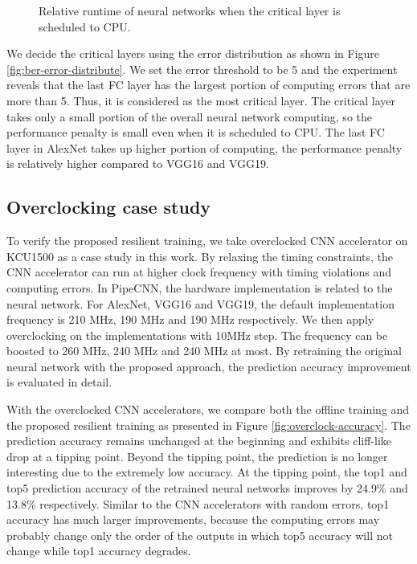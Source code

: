 \begin{figure}
        \caption{Relative runtime of neural networks when the critical layer is scheduled to CPU.}
        \label{fig:clp_perf}
\end{figure}

We decide the critical layers using the error distribution as shown in Figure \ref{fig:ber-error-distribute}.
We set the error threshold to be 5 and the experiment reveals that the last FC 
layer has the largest portion of computing errors that are more than 5. Thus, it is considered as 
the most critical layer. The critical layer takes only a small portion of the overall 
neural network computing, so the performance penalty is small even 
when it is scheduled to CPU. The last FC layer in AlexNet takes up higher portion of computing, 
the performance penalty is relatively higher compared to VGG16 and VGG19.
\begin{figure*}
        \caption{Error distribution across the neural network layers when highest BER is used in AlexNet, VGG16 and VGG19.}
        \label{fig:ber-error-distribute}
\end{figure*}

\subsection{Overclocking case study}
To verify the proposed resilient training, we take overclocked CNN accelerator on KCU1500 as a case 
study in this work. By relaxing the timing constraints, the CNN accelerator can 
run at higher clock frequency with timing violations and computing errors. In PipeCNN, the 
hardware implementation is related to the neural network. For AlexNet, VGG16 and VGG19, the 
default implementation frequency is 210 MHz, 190 MHz and 190 MHz respectively. We then apply overclocking 
on the implementations with 10MHz step. The frequency can be boosted to 
260 MHz, 240 MHz and 240 MHz at most. By retraining the original neural network with 
the proposed approach, the prediction accuracy improvement is evaluated in detail.

With the overclocked CNN accelerators, we compare both the offline 
training and the proposed resilient training as presented in Figure \ref{fig:overclock-accuracy}. 
The prediction accuracy remains unchanged at the beginning and exhibits cliff-like drop 
at a tipping point. Beyond the tipping point, the prediction is no longer interesting 
due to the extremely low accuracy. At the tipping point, the top1 and top5 prediction accuracy of the 
retrained neural networks improves by 24.9\% and 13.8\% respectively. Similar to the 
CNN accelerators with random errors, top1 accuracy has much larger improvements, because 
the computing errors may probably change only the order of the outputs in which top5 
accuracy will not change while top1 accuracy degrades. 

